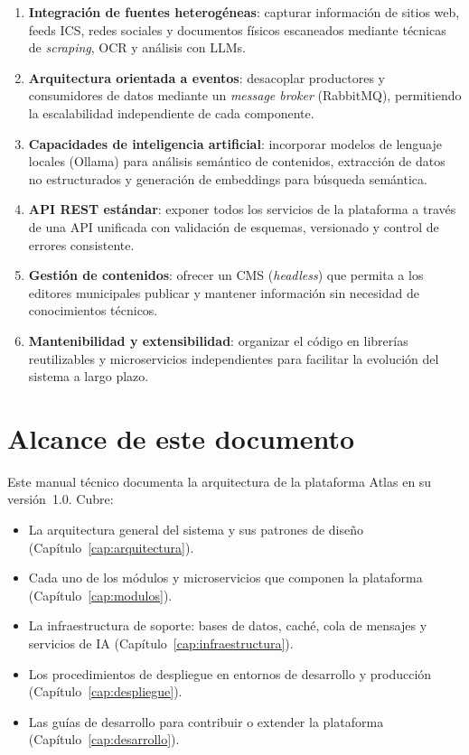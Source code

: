 \begin{enumerate}
  \item \textbf{Integración de fuentes heterogéneas}: capturar información de sitios web, feeds ICS, redes sociales y documentos físicos escaneados mediante técnicas de \textit{scraping}, OCR y análisis con LLMs.

  \item \textbf{Arquitectura orientada a eventos}: desacoplar productores y consumidores de datos mediante un \textit{message broker} (RabbitMQ), permitiendo la escalabilidad independiente de cada componente.

  \item \textbf{Capacidades de inteligencia artificial}: incorporar modelos de lenguaje locales (Ollama) para análisis semántico de contenidos, extracción de datos no estructurados y generación de embeddings para búsqueda semántica.

  \item \textbf{API REST estándar}: exponer todos los servicios de la plataforma a través de una API unificada con validación de esquemas, versionado y control de errores consistente.

  \item \textbf{Gestión de contenidos}: ofrecer un CMS (\textit{headless}) que permita a los editores municipales publicar y mantener información sin necesidad de conocimientos técnicos.

  \item \textbf{Mantenibilidad y extensibilidad}: organizar el código en librerías reutilizables y microservicios independientes para facilitar la evolución del sistema a largo plazo.
\end{enumerate}

\section{Alcance de este documento}

Este manual técnico documenta la arquitectura de la plataforma Atlas en su versión~1.0. Cubre:

\begin{itemize}
  \item La arquitectura general del sistema y sus patrones de diseño (Capítulo~\ref{cap:arquitectura}).
  \item Cada uno de los módulos y microservicios que componen la plataforma (Capítulo~\ref{cap:modulos}).
  \item La infraestructura de soporte: bases de datos, caché, cola de mensajes y servicios de IA (Capítulo~\ref{cap:infraestructura}).
  \item Los procedimientos de despliegue en entornos de desarrollo y producción (Capítulo~\ref{cap:despliegue}).
  \item Las guías de desarrollo para contribuir o extender la plataforma (Capítulo~\ref{cap:desarrollo}).
\end{itemize}

